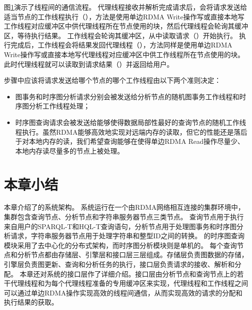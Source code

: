 \begin{figure}[htb]
\label{interface}
\end{figure}

图\ref{interface}演示了线程间的通信流程。
代理线程接收并解析完成请求后，会将请求发送给适当节点的工作线程执行（），方法是使用单边RDMA Write操作写或直接本地写工作线程对应缓冲区中供代理线程所在节点使用的块，然后代理线程会轮询其缓冲区，等待执行结果。
工作线程会轮询其缓冲区，从中读取请求（）开始执行。
执行完成后，工作线程会将结果发回代理线程（），方法同样是使用单边RDMA Write操作写或直接本地写代理线程对应缓冲区中供工作线程所在节点使用的块。
此时代理线程就可以读取到请求结果（）并返回给用户。

步骤中应该将请求发送给哪个节点的哪个工作线程由以下两个准则决定：
\begin{itemize}
    \item 图事务和时序图分析请求分别会被发送给分析节点的随机图事务工作线程和时序图分析工作线程处理；
    \item 时序图查询请求会被发送给能够使得数据局部性最好的查询节点的随机工作线程执行。虽然RDMA能够高效地实现对远端内存的读取，但它的性能还是落后于对本地内存的读，我们希望查询能够在使得单边RDMA Read操作尽量少、本地内存读尽量多的节点上被处理。
\end{itemize}

\section{本章小结}
本章介绍了\sys 的系统架构。
系统运行在一个由RDMA网络相互连接的集群环境中，集群包含查询节点、分析节点和字符串服务器节点三类节点。
查询节点用于执行来自用户的SPARQL-T和HQL-T查询语句，分析节点用于处理图事务和时序图分析请求，字符串服务器节点用于处理字符串和整型ID之间的转换。
\sys 的时序图查询模块采用了去中心化的分布式架构，而时序图分析模块则是单机的。
每个查询节点和分析节点都由存储层、引擎层和接口层三层组成。存储层负责图数据的存储，引擎层负责图更新、查询和分析任务的执行，接口层负责请求的接收、解析和分配。
本章还对系统的接口层作了详细介绍。接口层由分析节点和查询节点上的若干代理线程和为每个代理线程准备的专用缓冲区来实现，代理线程和工作线程之间可以通过单边RDMA操作实现高效的线程间通信，从而实现高效的请求的分配和执行结果的获取。